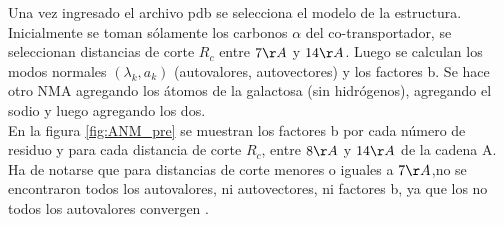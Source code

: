 Una vez ingresado el archivo pdb se selecciona el modelo de la estructura. Inicialmente se toman s\'{o}lamente los carbonos $\alpha$ del co-transportador, se seleccionan distancias de corte $R_c$ entre $7\AA$ y $14\AA$. Luego se calculan los modos normales $(\lambda_k,a_k)$ (autovalores, autovectores) y los factores b. Se hace otro NMA agregando los \'{a}tomos de la galactosa (sin hidr\'{o}genos), agregando el sodio y luego agregando los dos.\\

En la figura \ref{fig:ANM_pre} se muestran los factores b por cada n\'{u}mero de residuo y para cada distancia de corte $R_c$, entre $8\AA$ y $14\AA$ de la cadena A. Ha de notarse que para distancias de corte menores o iguales a $7\AA$,no se encontraron todos  los autovalores, ni autovectores, ni factores b, ya que los no todos los autovalores convergen \cite{Zimmermann2011}.\\


